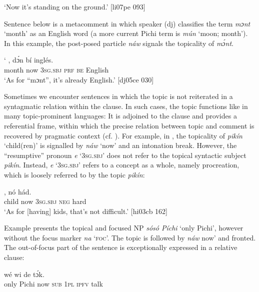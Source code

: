 \glt ‘Now it’s standing on the ground.’ [li07pe 093]
\z

Sentence  below is a metacomment in which speaker (dj) classifies the term \textit{mɔnt} ‘month’ as an English word (a more current Pichi term is \textit{mún} ‘moon; month’). In this example, the post-posed particle \textit{náw} signals the topicality of \textit{mɔ́nt}. 


\ea%
    \label{ex:key:757}
    \gll ‘  ,      dɔ́n  bí  inglés.\\
month  now    \textsc{3sg.sbj}  \textsc{prf}  \textsc{be}  English\\

\glt ‘As for “mɔnt”, it’s already English.’ [dj05ce 030]
\z

Sometimes we encounter sentences in which the topic is not reiterated in a syntagmatic relation within the clause. In such cases, the topic functions like in many topic-prominent languages: It is adjoined to the clause and provides a referential frame, within which the precise relation between topic and comment is recovered by pragmatic context (cf. \citealt{LiThompson1976}). For example, in , the topicality of \textit{pikín} ‘child(ren)’ is signalled by \textit{náw} ‘now’ and an intonation break. However, the “resumptive” pronoun \textit{e} ‘\textsc{3sg.sbj}’ does not refer to the topical syntactic subject \textit{pikín}. Instead, \textit{e} ‘\textsc{3sg.sbj}’ refers to a concept as a whole, namely procreation, which is loosely referred to by the topic \textit{pikín}:


\ea%
    \label{ex:key:758}
    \gll {}  ,    nó  hád.\\
child  now  \textsc{3sg.sbj}  \textsc{neg}  hard\\

\glt ‘As for [having] kids, that’s not difficult.’ [hi03cb 162]
\z

Example  presents the topical and focused \textsc{NP} \textit{sósó Píchi} ‘only Pichi’, however without the focus marker \textit{na} ‘\textsc{foc}’. The topic is followed by \textit{náw} now’ and fronted. The out-of-focus part of the sentence is exceptionally expressed in a relative clause: 


\ea%
    \label{ex:key:759}
    \gll {}        wé  wi  de  tɔ́k.\\
only    Pichi  now    \textsc{sub}  \textsc{1pl}  \textsc{ipfv}  talk\\

